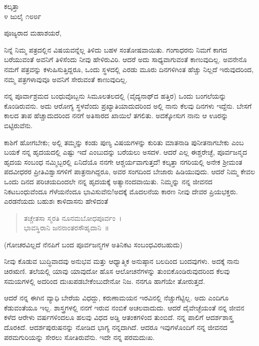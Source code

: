 \begin{flushright}
ಕಲ್ಕತ್ತಾ\\೪ ಜುಲೈ ೧೮೮೯
\end{flushright}

\noindent
ಪೂಜ್ಯರಾದ ಮಹಾಶಯರೆ,

ನಿನ್ನೆ ನಿಮ್ಮ ಪತ್ರದಲ್ಲಿನ ವಿಷಯವನ್ನೆಲ್ಲ ತಿಳಿದು ಬಹಳ ಸಂತೋಷವಾಯಿತು. ಗಂಗಾಧರನು ನಿಮಗೆ ಕಾಗದ ಬರೆಯುವಂತೆ ಅವನಿಗೆ ತಿಳಿಸೆಂದು ನೀವು ಹೇಳಿರುವಿರಿ. ಆದರೆ ಅದು ಸಾಧ್ಯವಾಗುವಂತೆ ಕಾಣುವುದಿಲ್ಲ. ಅವನೇನೊ ನಮಗೆ ಪತ್ರವನ್ನು ಕಳುಹಿಸು\break ತ್ತಿದ್ದರೂ, ಒಂದು ಸ್ಥಳದಲ್ಲಿ ಎರಡು ಮೂರು ದಿನಗಳಿಗಿಂತ ಹೆಚ್ಚು ನಿಲ್ಲದೆ ಇರುವುದರಿಂದ, ನಮ್ಮ ಪತ್ರಗಳಾವುವೂ ಅವನಿಗೆ ಸೇರುವಂತೆ ಕಾಣುವುದಿಲ್ಲ.

ನನ್ನ ಪೂರ್ವಾಶ್ರಮದ ಬಂಧುವೊಬ್ಬನು ಸಿಮೂಲತಲದಲ್ಲಿ (ವೈದ್ಯನಾಥ್‌ದ ಹತ್ತಿರ) ಒಂದು ಬಂಗಲೆಯನ್ನು ಕೊಂಡಿರುವನು. ಅದು ಆರೋಗ್ಯ ಸ್ಥಳವೆಂದು ಪ್ರಖ್ಯಾತಿಯಾದುದರಿಂದ ಅಲ್ಲಿ ನಾನು ಕೆಲವು ದಿನಗಳು ಇದ್ದೆನು. ಬೇಸಗೆ ಕಾಲದ ತಾಪ ಹೆಚ್ಚಾದುದರಿಂದ ನನಗೆ ಅತಿಸಾರದ ಖಾಯಿಲೆ ತಗಲಿತು. ಅದಕ್ಕೋಸುಗ ನಾನು ಆ ಊರನ್ನು ಬಿಟ್ಟಿರುವೆನು.

ಕಾಶಿಗೆ ಹೋಗಬೇಕು; ಅಲ್ಲಿ ತಮ್ಮನ್ನು ಕಂಡು ಪುಣ್ಯ ವಿಷಯಗಳನ್ನು ಕುರಿತು ಮಾತನಾಡಿ ಪುನೀತನಾಗಬೇಕು ಎಂಬ ಬಯಕೆ ನನ್ನ ಹೃದಯದಲ್ಲಿ ಎಷ್ಟು ಇದೆ ಎಂಬುದನ್ನು ಬರೆಯಲು ಅಸದಳ. ಆದರೆ ಎಲ್ಲ ಈಶ್ಚರೇಚ್ಛೆ, ಪೂರ್ವಜನ್ಮದ ಹೃದಯ ಸಂಬಂಧ ನಮ್ಮಿಬ್ಬರಲ್ಲಿ ಏನಿದೆಯೊ ನನಗೇ ಆಶ್ಚರ್ಯವಾಗುತ್ತದೆ! ಕಲ್ಕತ್ತಾ ನಗರಿಯಲ್ಲಿ ಅನೇಕ ಶ‍್ರೀಮಂತ ಪದವೀಧರರ ಪ್ರೀತಿವಿಶ್ವಾಸಗಳಿಗೆ ಪಾತ್ರನಾಗಿದ್ದರೂ, ಅವರ ಸಂಗದಿಂದ ಬೇಜಾರು ಹಿಡಿಯುವುದು. ಆದರೆ ನಿಮ್ಮ ಕೇವಲ ಒಂದು ದಿನದ ಪರಿಚಯದಿಂದಲೇ ನನ್ನ ಹೃದಯಕ್ಕೆ ಅತ್ಯಾನಂದವಾಯಿತು. ನಿಮ್ಮನ್ನು ನನ್ನ ಜೀವನದ ನಿಕಟಬಂಧುವೆಂದೂ ಗೆಳೆಯನೆಂದೂ ಭಾವಿಸುವೆನು!ಅದಕ್ಕೆ ಮೊದಲನೆಯ ಕಾರಣ ನೀವು ದೇವರ ಪ್ರಿಯಭಕ್ತರು. ಎರಡನೆಯದು ಬಹುಶಃ ಕಾಳಿದಾಸನು ಹೇಳಿದಂತೆ \enginline{-}

\begin{verse}
 ತಚ್ಚೇತಸಾ ಸ್ಮರತಿ ನೂನಮಬೋಧಪೂರ್ವಂ~।\\
 ಭಾವಸ್ಥಿರಾನಿ ಜನನಾಂತರಸೌಹೃದಾನಿ~॥ 
\end{verse}


(ಗೋಚರವಿಲ್ಲದೆ ನೆನಪಿಗೆ ಬಂದ ಪೂರ್ವಜನ್ಮಗಳ ಅತಿನಿಕಟ ಸಂಬಂಧವಿರಬಹುದು)

ನೀವು ಕೊಡುವ ಬುದ್ಧಿವಾದವು ಅನುಭವ ಮತ್ತು ಆಧ್ಯಾತ್ಮಿಕ ಅನುಷ್ಠಾನ ಬಲದಿಂದ ಬಂದವುಗಳು. ಅದಕ್ಕೆ ನಾನು ಚಿರಋಣಿ. ತಲೆಯಲ್ಲಿ ಯಾವು ಯಾವುದೋ ಹೊಸ ಆಲೋಚನೆಗಳನ್ನು ತುಂಬಿಕೊಂಡಿರುವುದರಿಂದ ಕೆಲವು ಸಮಯಗಳಲ್ಲಿ ಅದರಿಂದ ದುಃಖಪಡಬೇಕೆಂಬುದೇನೋ ನಿಜ. ನನಗೂ ಹಾಗೆಯೇ ತೋರುತ್ತದೆ.

ಆದರೆ ನನ್ನ ಈಗಿನ ವ್ಯಾಧಿ ಬೇರೆಯ ವಿಧದ್ದು, ಕರುಣಾಮಯನ ಇರವಿನಲ್ಲಿ ನೆಚ್ಚುಗೆಟ್ಟಿಲ್ಲ. ಅದು ಎಂದಿಗೂ ಕೆಡುವಂತೆಯೂ ಇಲ್ಲ. ಶಾಸ್ತ್ರಗಳಲ್ಲಿ ನನಗೆ ಇರುವ ನಂಬಿಕೆ ಅಚಲವಾದುದು. ಆದರೆ ದೈವೇಚ್ಛೆಯಂತೆ ನನ್ನ ಜೀವನ ಕಳೆದ ಆರೇಳು ವರ್ಷಗಳಿಂದಲೂ ಹಲವು ವಿಧದ ಅಡ್ಡಿ ಆತಂಕಗಳಿಂದ ತುಂಬಿದೆ. ನನ್ನ ಪಾಲಿಗೆ ಆದರ್ಶಶಾಸ್ತ್ರ ದೊರಕಿದೆ. ಆದರ್ಶಪುರುಷನನ್ನು ನೋಡಿದ ಭಾಗ್ಯ ನನ್ನದಾಗಿದೆ. ಆದರೂ ಇವುಗಳೊಂದಿಗೆ ನನ್ನ ಜೀವನದ ಪರಮಗುರಿಯನ್ನು ಸೇರಲು ಸೋತಿರುವೆನು. ಇದೇ ನನ್ನ ಪರಮದುಃಖ.

